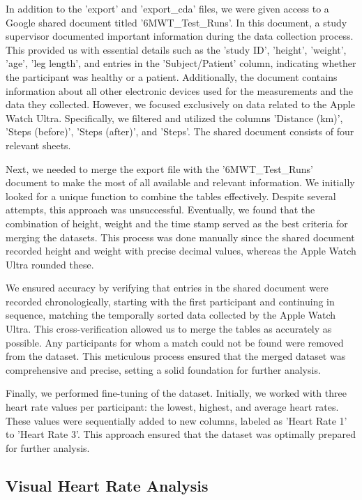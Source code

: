 In addition to the 'export' and 'export\_cda' files, we were given access to a Google shared document titled '6MWT\_Test\_Runs'. In this document, a study supervisor documented important information during the data collection process. This provided us with essential details such as the 'study ID', 'height', 'weight', 'age', 'leg length', and entries in the 'Subject/Patient' column, indicating whether the participant was healthy or a patient. Additionally, the document contains information about all other electronic devices used for the measurements and the data they collected. However, we focused exclusively on data related to the Apple Watch Ultra. Specifically, we filtered and utilized the columns 'Distance (km)', 'Steps (before)', 'Steps (after)', and 'Steps'. The shared document consists of four relevant sheets.

Next, we needed to merge the export file with the '6MWT\_Test\_Runs' document to make the most of all available and relevant information. We initially looked for a unique function to combine the tables effectively. Despite several attempts, this approach was unsuccessful. Eventually, we found that the combination of height, weight and the time stamp served as the best criteria for merging the datasets. This process was done manually since the shared document recorded height and weight with precise decimal values, whereas the Apple Watch Ultra rounded these.

We ensured accuracy by verifying that entries in the shared document were recorded chronologically, starting with the first participant and continuing in sequence, matching the temporally sorted data collected by the Apple Watch Ultra. This cross-verification allowed us to merge the tables as accurately as possible. Any participants for whom a match could not be found were removed from the dataset. This meticulous process ensured that the merged dataset was comprehensive and precise, setting a solid foundation for further analysis.

Finally, we performed fine-tuning of the dataset. Initially, we worked with three heart rate values per participant: the lowest, highest, and average heart rates. These values were sequentially added to new columns, labeled as 'Heart Rate 1' to 'Heart Rate 3'. This approach ensured that the dataset was optimally prepared for further analysis.

\subsection{Visual Heart Rate Analysis}

